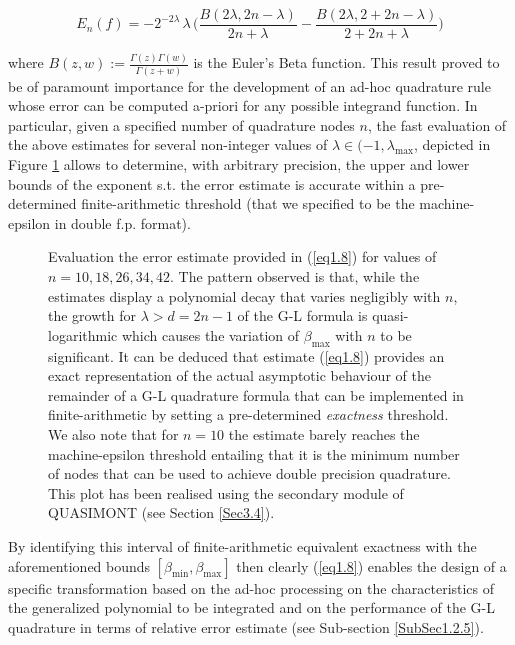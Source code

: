 \documentclass[a4paper, twosided]{book}
\begin{document}
\begin{equation}\label{eq1.8}
    E_n(f) = -2^{-2\lambda}\,\lambda\,\bigg(\frac{B(2\lambda,2n-\lambda)}{2n+\lambda} - \frac{B(2\lambda, 2+2n-\lambda)}{2+2n+\lambda}\bigg)
\end{equation}

\noindent
where $B(z,w):=\frac{\Gamma(z)\Gamma(w)}{\Gamma(z+w)}$ is the Euler's Beta function. This result proved to be of paramount importance for the development of an ad-hoc quadrature rule whose error can be computed a-priori for any possible integrand function. In particular, given a specified number of quadrature nodes $n$, the fast evaluation of the above estimates for several non-integer values of $\lambda\in(-1,\lambda_{\text{max}}$, depicted in Figure \ref{Fig1.1} allows to determine, with arbitrary precision, the upper and lower bounds of the exponent s.t. the error estimate is accurate within a pre-determined finite-arithmetic threshold (that we specified to be the machine-epsilon in double f.p. format).

\begin{center}
        \begin{figure}[H]
        \captionsetup{singlelinecheck=off}
        
        \caption{Evaluation the error estimate provided in (\ref{eq1.8}) for values of $n=10,18,26,34,42$. The pattern observed is that, while the estimates display a polynomial decay that varies negligibly with $n$, the growth for $\lambda>d=2n-1$ of the G-L formula is quasi-logarithmic which causes the variation of $\beta_{\text{max}}$ with $n$ to be significant. It can be deduced that estimate (\ref{eq1.8}) provides an exact representation of the actual asymptotic behaviour of the remainder of a G-L quadrature formula that can be implemented in finite-arithmetic by setting a pre-determined {\itshape exactness} threshold. We also note that for $n=10$ the estimate barely reaches the machine-epsilon threshold entailing that it is the minimum number of nodes that can be used to achieve double precision quadrature. This plot has been realised using the secondary module of QUASIMONT (see Section \ref{Sec3.4}).}
        \label{Fig1.1}
        \end{figure}
\end{center}

By identifying this interval of finite-arithmetic equivalent exactness with the aforementioned bounds $[\beta_{\text{min}}, \beta_{\text{max}}]$ then clearly (\ref{eq1.8}) enables the design of a specific transformation based on the ad-hoc processing on the characteristics of the generalized polynomial to be integrated and on the performance of the G-L quadrature in terms of relative error estimate (see Sub-section \ref{SubSec1.2.5}).
\end{document}
